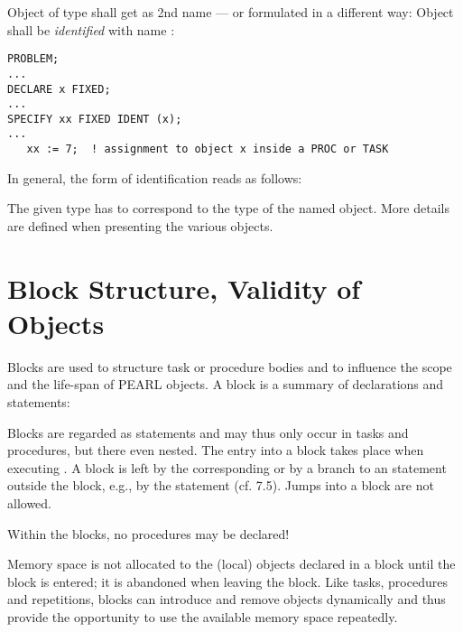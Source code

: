 Object  of type  shall get  as 2nd name
 --- or formulated in a different way:
 Object  shall be {\it identified} with name :

\begin{lstlisting}
PROBLEM;
...
DECLARE x FIXED;
...
SPECIFY xx FIXED IDENT (x);
...
   xx := 7;  ! assignment to object x inside a PROC or TASK
\end{lstlisting}
In general, the form of identification reads as follows:


\begin{grammarframe}

\end{grammarframe}

The given type has to correspond to the type of the named object. More
details are defined when presenting the various objects.

\section{Block Structure, Validity of Objects}   %
\label{sec_block}

Blocks are used to structure task or procedure bodies and to influence
the scope and the life-span of PEARL objects. A block is a summary of
declarations and statements:

\begin{grammarframe}
\end{grammarframe}

Blocks are regarded as statements and may thus only occur in tasks and
procedures, but there even nested. The entry into a block takes
place when executing . A block is left by the corresponding 
 or
by a branch to an statement outside the block, e.g., by the  
statement (cf. 7.5). Jumps into a block are not allowed.

Within the blocks, no procedures may be declared!

Memory space is not allocated to the (local) objects declared in a block
until the block is entered; it is abandoned when leaving the block. Like
tasks, procedures and repetitions, blocks can introduce and remove
objects dynamically and thus provide the opportunity to use the
available memory space repeatedly.

